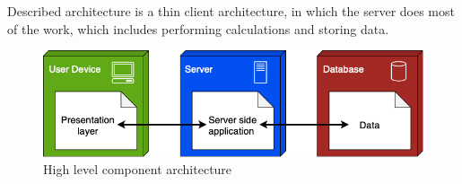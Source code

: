 Described architecture is a thin client architecture, in which the server does most of the work, which includes performing calculations and storing data.
\begin{figure}[H]
    \centering
    \includegraphics[height=0.7\textwidth]{Images/Overview.png}
    \caption{High level component architecture}
\end{figure}


